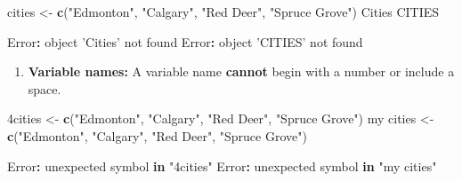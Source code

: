\documentclass[]{book}
\newenvironment{Shaded}{\begin{snugshade}}{\end{snugshade}}
\newcommand{\ControlFlowTok}[1]{\textcolor[rgb]{0.13,0.29,0.53}{\textbf{#1}}}
\newcommand{\KeywordTok}[1]{\textcolor[rgb]{0.13,0.29,0.53}{\textbf{#1}}}
\newcommand{\NormalTok}[1]{#1}
\newcommand{\OperatorTok}[1]{\textcolor[rgb]{0.81,0.36,0.00}{\textbf{#1}}}
\newcommand{\StringTok}[1]{\textcolor[rgb]{0.31,0.60,0.02}{#1}}
\providecommand{\tightlist}{%
  \setlength{\itemsep}{0pt}\setlength{\parskip}{0pt}}
\begin{document}
\begin{Shaded}
\begin{Highlighting}[]
\NormalTok{cities <-}\StringTok{ }\KeywordTok{c}\NormalTok{(}\StringTok{"Edmonton"}\NormalTok{, }\StringTok{"Calgary"}\NormalTok{, }\StringTok{"Red Deer"}\NormalTok{, }\StringTok{"Spruce Grove"}\NormalTok{)}
\NormalTok{Cities}
\NormalTok{CITIES}

\NormalTok{Error}\OperatorTok{:}\StringTok{ }\NormalTok{object }\StringTok{'Cities'}\NormalTok{ not found}
\NormalTok{Error}\OperatorTok{:}\StringTok{ }\NormalTok{object }\StringTok{'CITIES'}\NormalTok{ not found}
\end{Highlighting}
\end{Shaded}

\begin{enumerate}
\def\labelenumi{\arabic{enumi}.}
\setcounter{enumi}{1}
\tightlist
\item
  \textbf{Variable names:} A variable name \textbf{cannot} begin with a number or include a space.
\end{enumerate}

\begin{Shaded}
\begin{Highlighting}[]
\NormalTok{4cities <-}\StringTok{ }\KeywordTok{c}\NormalTok{(}\StringTok{"Edmonton"}\NormalTok{, }\StringTok{"Calgary"}\NormalTok{, }\StringTok{"Red Deer"}\NormalTok{, }\StringTok{"Spruce Grove"}\NormalTok{)}
\NormalTok{my cities <-}\StringTok{ }\KeywordTok{c}\NormalTok{(}\StringTok{"Edmonton"}\NormalTok{, }\StringTok{"Calgary"}\NormalTok{, }\StringTok{"Red Deer"}\NormalTok{, }\StringTok{"Spruce Grove"}\NormalTok{)}

\NormalTok{Error}\OperatorTok{:}\StringTok{ }\NormalTok{unexpected symbol }\ControlFlowTok{in} \StringTok{"4cities"}
\NormalTok{Error}\OperatorTok{:}\StringTok{ }\NormalTok{unexpected symbol }\ControlFlowTok{in} \StringTok{"my cities"}
\end{Highlighting}
\end{Shaded}
\end{document}
